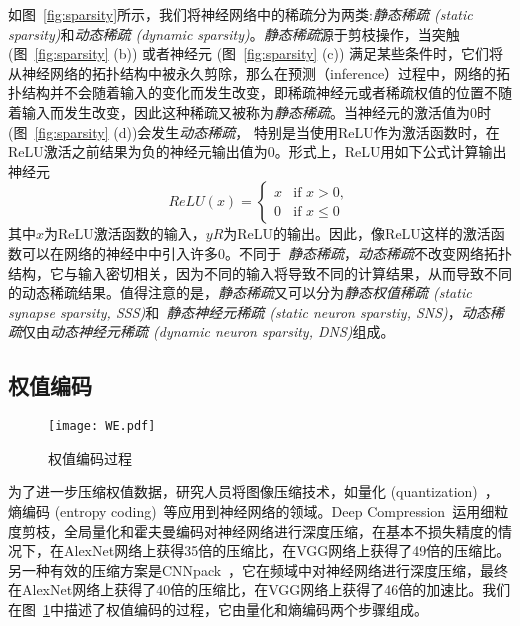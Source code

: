 如图~\ref{fig:sparsity}所示，我们将神经网络中的稀疏分为两类:\emph{静态稀疏 (static sparsity)}和\emph{动态稀疏 (dynamic sparsity)}。\emph{静态稀疏}源于剪枝操作，当突触 (图~\ref{fig:sparsity} (b)) 或者神经元 (图~\ref{fig:sparsity} (c)) 满足某些条件时，它们将从神经网络的拓扑结构中被永久剪除，那么在预测（inference）过程中，网络的拓扑结构并不会随着输入的变化而发生改变，即稀疏神经元或者稀疏权值的位置不随着输入而发生改变，因此这种稀疏又被称为\emph{静态稀疏}。当神经元的激活值为$0$时(图~\ref{fig:sparsity} (d))会发生\emph{动态稀疏}， 特别是当使用ReLU作为激活函数时，在ReLU激活之前结果为负的神经元输出值为$0$。形式上，ReLU用如下公式计算输出神经元
\begin{equation}
ReLU(x)=
\begin{cases}
x & \text{if } x > 0, \\
0 & \text{if } x \leq 0
\end{cases}
\end{equation}
其中$x$为ReLU激活函数的输入，$yR$为ReLU的输出。因此，像ReLU这样的激活函数可以在网络的神经中中引入许多$0$。不同于~\emph{静态稀疏}，\emph{动态稀疏}不改变网络拓扑结构，它与输入密切相关，因为不同的输入将导致不同的计算结果，从而导致不同的动态稀疏结果。值得注意的是，\emph{静态稀疏}又可以分为\emph{静态权值稀疏 (static synapse sparsity, SSS)}和~\emph{静态神经元稀疏 (static neuron sparstiy, SNS)}，\emph{动态稀疏}仅由\emph{动态神经元稀疏 (dynamic neuron sparsity, DNS)}组成。

\subsection{权值编码}

\begin{figure}[h]
\centering
\texttt{[image: WE.pdf]}
\caption{权值编码过程}
\label{fig:weight_encoding}
\end{figure}

为了进一步压缩权值数据，研究人员将图像压缩技术，如量化 (quantization)~\cite{henneaux1992quantization}，熵编码 (entropy coding)~\cite{mackay2003information}等应用到神经网络的领域。Deep Compression~\cite{han2015deep}运用细粒度剪枝，全局量化和霍夫曼编码对神经网络进行深度压缩，在基本不损失精度的情况下，在AlexNet网络上获得35倍的压缩比，在VGG网络上获得了49倍的压缩比。另一种有效的压缩方案是CNNpack~\cite{wang2016cnnpack}，它在频域中对神经网络进行深度压缩，最终在AlexNet网络上获得了40倍的压缩比，在VGG网络上获得了46倍的加速比。我们在图~\ref{fig:weight_encoding}中描述了权值编码的过程，它由量化和熵编码两个步骤组成。

